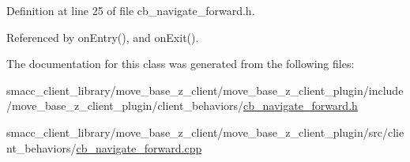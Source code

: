 Definition at line 25 of file cb\+\_\+navigate\+\_\+forward.\+h.



Referenced by on\+Entry(), and on\+Exit().



The documentation for this class was generated from the following files\+:\begin{DoxyCompactItemize}
\item 
smacc\+\_\+client\+\_\+library/move\+\_\+base\+\_\+z\+\_\+client/move\+\_\+base\+\_\+z\+\_\+client\+\_\+plugin/include/move\+\_\+base\+\_\+z\+\_\+client\+\_\+plugin/client\+\_\+behaviors/\hyperlink{cb__navigate__forward_8h}{cb\+\_\+navigate\+\_\+forward.\+h}\item 
smacc\+\_\+client\+\_\+library/move\+\_\+base\+\_\+z\+\_\+client/move\+\_\+base\+\_\+z\+\_\+client\+\_\+plugin/src/client\+\_\+behaviors/\hyperlink{cb__navigate__forward_8cpp}{cb\+\_\+navigate\+\_\+forward.\+cpp}\end{DoxyCompactItemize}
